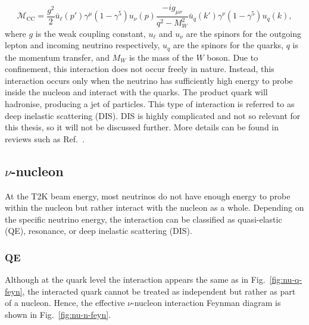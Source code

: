\begin{equation}
  \mathcal{M}_{\text{CC}} = \frac{g^2}{2} \bar{u}_\ell(p') \gamma^\mu (1 - \gamma^5) u_\nu(p) \frac{-i g_{\mu\nu}}{q^2 - M_W^2} \bar{u}_q(k') \gamma^\nu (1 - \gamma^5) u_q(k),
\end{equation}
where $g$ is the weak coupling constant, $u_\ell$ and $u_\nu$ are the spinors for the outgoing lepton and incoming neutrino respectively, $u_q$ are the spinors for the quarks, $q$ is the momentum transfer, and $M_W$ is the mass of the $W$ boson.
Due to confinement, this interaction does not occur freely in nature.
Instead, this interaction occurs only when the neutrino has sufficiently high energy to probe inside the nucleon and interact with the quarks.
The product quark will hadronise, producing a jet of particles.
This type of interaction is referred to as deep inelastic scattering (DIS).
DIS is highly complicated and not so relevant for this thesis, so it will not be discussed further.
More details can be found in reviews such as Ref.~\cite{SajjadAthar:2022pjt}.

\subsection{$\nu$-nucleon}
At the T2K beam energy, most neutrinos do not have enough energy to probe within the nucleon but rather interact with the nucleon as a whole.
Depending on the specific neutrino energy, the interaction can be classified as quasi-elastic (QE), resonance, or deep inelastic scattering (DIS).

\subsubsection{QE}
Although at the quark level the interaction appears the same as in Fig.~\ref{fig:nu-q-feyn}, the interacted quark cannot be treated as independent but rather as part of a nucleon.
Hence, the effective $\nu$-nucleon interaction Feynman diagram is shown in Fig.~\ref{fig:nu-n-feyn}.

